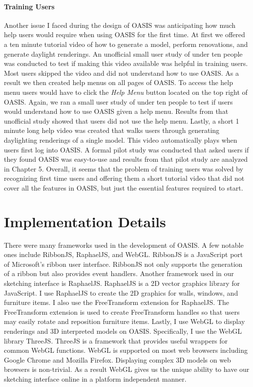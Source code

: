 \paragraph{Training Users}
Another issue I faced during the design of OASIS was anticipating how much help users would require when using OASIS for the first time. At first we offered a ten minute tutorial video of how to generate a model, perform renovations, and generate daylight renderings. An unofficial small user study of under ten people was conducted to test if making this video available was helpful in training users. Most users skipped the video and did not understand how to use OASIS. As a result we then created help menus on all pages of OASIS. To access the help menu users would have to click the \textit{Help Menu} button located on the top right of OASIS. Again, we ran a small user study of under ten people to test if users would understand how to use OASIS given a help menu.
Results from that unofficial study showed that users did not use the help menu.
Lastly, a short 1 minute long help video was created that walks users through generating daylighting renderings of a single model. This video automatically plays when users first log into OASIS.
A formal pilot study was conducted that asked users if they found OASIS was easy-to-use and results from that pilot study are analyzed in Chapter 5. Overall, it seems that the problem of training users was solved by recognizing first time users and offering them a short tutorial video that did not cover all the features in OASIS, but just the essential features required to start.

\section{Implementation Details}
There were many frameworks used in the development of OASIS.
A few notable ones include RibbonJS, RaphaelJS, and WebGL.
RibbonJS is a JavaScript port of Microsoft's ribbon user interface.
RibbonJS not only supports the generation of a ribbon but also provides event handlers.
Another framework used in our sketching interface is RaphaelJS\cite{todo}.
RaphaelJS is a 2D vector graphics library for JavaScript. 
I use RaphaelJS to create the 2D graphics for walls, windows, and furniture items.
 I also use the FreeTransform extension for RaphaelJS\cite{todo}. 
The FreeTransform extension is used to create FreeTransform handles so that users may easily rotate and reposition furniture items.
Lastly, I use WebGL to display renderings and 3D interpreted models on OASIS. 
Specifically, I use the WebGL library ThreeJS\cite{todo}.
ThreeJS is a framework that provides useful wrappers for common WebGL functions.
WebGL is supported on most web browsers including Google Chrome and Mozilla Firefox\cite{todo}.
Displaying complex 3D models on web browsers is non-trivial.
As a result WebGL gives us the unique ability to have our sketching interface online in a platform independent manner.


